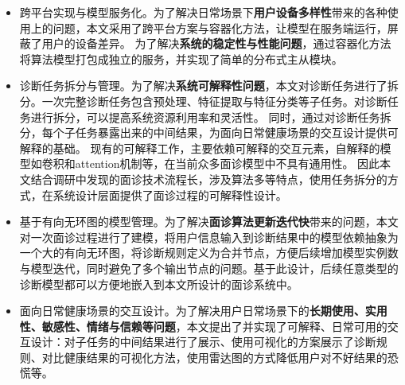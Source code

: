 \begin{itemize}

    \item 跨平台实现与模型服务化。为了解决日常场景下\textbf{用户设备多样性}带来的各种使用上的问题，本文采用了跨平台方案与容器化方法，让模型在服务端运行，屏蔽了用户的设备差异。
    为了解决\textbf{系统的稳定性与性能问题}，通过容器化方法将算法模型打包成独立的服务，并实现了简单的分布式主从模块。

    \item 诊断任务拆分与管理。为了解决\textbf{系统可解释性问题}，本文对诊断任务进行了拆分。一次完整诊断任务包含预处理、特征提取与特征分类等子任务。对诊断任务进行拆分，可以提高系统资源利用率和灵活性。
    同时，通过对诊断任务拆分，每个子任务暴露出来的中间结果，为面向日常健康场景的交互设计提供可解释的基础。
    现有的可解释工作，主要依赖可解释的交互元素，自解释的模型如卷积和attention机制等\cite{abdul2018trends}，在当前众多面诊模型中不具有通用性。
    因此本文结合调研中发现的面诊技术流程长，涉及算法多等特点，使用任务拆分的方式，在系统设计层面提供了面诊过程的可解释性设计。
    
    \item 基于有向无环图的模型管理。为了解决\textbf{面诊算法更新迭代快}带来的问题，本文对一次面诊过程进行了建模，将用户信息输入到诊断结果中的模型依赖抽象为一个大的有向无环图，将诊断规则定义为合并节点，方便后续增加模型实例数与模型迭代，同时避免了多个输出节点的问题。基于此设计，后续任意类型的诊断模型都可以方便地嵌入到本文所设计的面诊系统中。
    
    \item 面向日常健康场景的交互设计。为了解决用户日常场景下的\textbf{长期使用、实用性、敏感性、情绪与信赖等问题}，本文提出了并实现了可解释、日常可用的交互设计：对子任务的中间结果进行了展示、使用可视化的方案展示了诊断规则、对比健康结果的可视化方法，使用雷达图的方式降低用户对不好结果的恐慌等。

\end{itemize}

